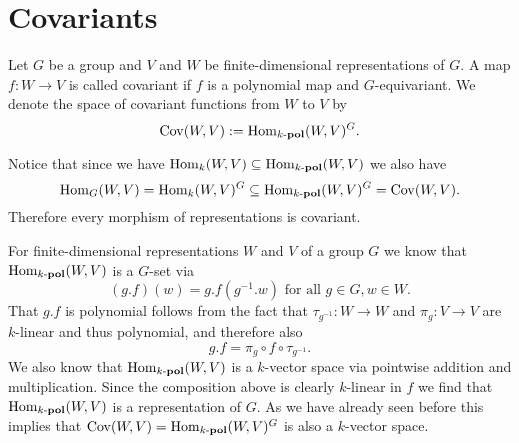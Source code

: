 \section{Covariants}


\begin{defi}
 Let $G$ be a group and $V$ and $W$ be finite-dimensional representations of $G$. A map $f : W \to V$ is called covariant if $f$ is a polynomial map and $G$-equivariant. We denote the space of covariant functions from $W$ to $V$ by
 \[
  \operatorname{Cov}(W,V) :=  \operatorname{Hom}_{k\text{-}\mathbf{pol}}(W,V)^G.
 \]
\end{defi}


Notice that since we have $\operatorname{Hom}_k(W,V) \subseteq \operatorname{Hom}_{k\text{-}\mathbf{pol}}(W,V)$ we also have
\[
 \operatorname{Hom}_G(W,V) = \operatorname{Hom}_k(W,V)^G \subseteq \operatorname{Hom}_{k\text{-}\mathbf{pol}}(W,V)^G = \operatorname{Cov}(W,V).
\]
Therefore every morphism of representations is covariant.


For finite-dimensional representations $W$ and $V$ of a group $G$ we know that $\operatorname{Hom}_{k\text{-}\mathbf{pol}}(W,V)$ is a $G$-set via
\[
 (g.f)(w) = g.f\left(g^{-1}.w\right) \text{ for all } g \in G, w \in W.
\]
That $g.f$ is polynomial follows from the fact that $\tau_{g^{-1}} : W \to W$ and $\pi_g : V \to V$ are $k$-linear and thus polynomial, and therefore also
\[
 g.f = \pi_g \circ f \circ \tau_{g^{-1}}.
\]
We also know that $\operatorname{Hom}_{k\text{-}\mathbf{pol}}(W,V)$ is a $k$-vector space via pointwise addition and multiplication. Since the composition above is clearly $k$-linear in $f$ we find that $\operatorname{Hom}_{k\text{-}\mathbf{pol}}(W,V)$ is a representation of $G$. As we have already seen before this implies that $\operatorname{Cov}(W,V) = \operatorname{Hom}_{k\text{-}\mathbf{pol}}(W,V)^G$ is also a $k$-vector space.























